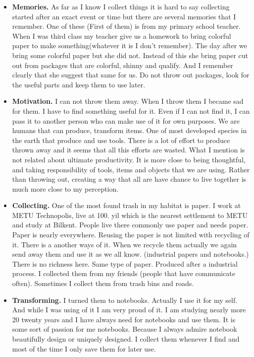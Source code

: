 \begin{itemize}
\item \textbf{Memories.} As far as I know I collect things it is hard to say collecting started after an exact event or time but there are several memories that I remember. One of these (First of them) is from my primary school teacher. When I was third class my teacher give us a homework to bring colorful paper to make something(whatever it is I don't remember). The day after we bring some colorful paper but she did not. Instead of this she bring paper cut out from packages that are colorful, shinny and qualify. And I remember clearly that she suggest that same for us. Do not throw out packages, look for the useful parts and keep them to use later. 
\item \textbf{Motivation.} I can not throw them away. When I throw them I became sad for them. I have to find something useful for it. Even if I can not find it, I can pass it to another person who can make use of it for own purposes. We are humans that can produce, transform items. One of most developed species in the earth that produce and use tools. There is a lot of effort to produce thrown away and it seems that all this efforts are wasted. What I mention is not related about ultimate productivity. It is more close to being thoughtful, and taking responsibility of tools, items and objects that we are using. Rather than throwing out, creating a way that all are have chance to live together is much more close to my perception. 
\item \textbf{Collecting.} One of the most found trash in my habitat is paper. I work at METU Technopolis, live at 100. yil which is the nearest settlement to METU and study at Bilkent. People live there commonly use paper and needs paper. Paper is nearly everywhere. Reusing the paper is not limited with recycling of it. There is a another ways of it. When we recycle them actually we again send away them and use it as we all know. (industrial papers and notebooks.) There is no richness here. Same type of paper. Produced after a industrial process. I collected them from my friends (people that have communicate often). Sometimes I collect them from trash bins and roads. 
\item \textbf{Transforming.} I turned them to notebooks. Actually I use it for my self. And while I was using of it I am very proud of it. I am studying nearly more 20 twenty years and I have always need for notebooks and use them. It is some sort of passion for me notebooks. Because I always admire notebook beautifully design or uniquely designed. I collect them whenever I find and most of the time I only save them for later use. 
\end{itemize}

